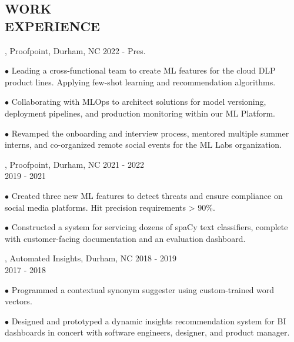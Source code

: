 \documentclass[resmargin, 11pt]{resume_style_class} %
\newenvironment{outline}
  {\begin{list}{}{\setlength{\leftmargin}{30pt}\setlength\itemsep{-2pt}}}
  {\end{list}}
\begin{document}
\begin{resume}

 
\section{WORK \\ EXPERIENCE}
, Proofpoint, Durham, NC \hfill 2022 - Pres.
\begin{outline}
	\item[$\bullet$\hspace{0.1cm}] Leading a cross-functional team to create ML features for the cloud DLP product lines. Applying few-shot learning and recommendation algorithms.
	\item[$\bullet$\hspace{0.1cm}] Collaborating with MLOps to architect solutions for model versioning, deployment pipelines, and production monitoring within our ML Platform.
	\item[$\bullet$\hspace{0.1cm}] Revamped the onboarding and interview process, mentored multiple summer interns, and co-organized remote social events for the ML Labs organization.
\end{outline} 
, Proofpoint, Durham, NC \hfill 2021 - 2022 \\
 \hfill 2019 - 2021
\begin{outline}
	\item[$\bullet$\hspace{0.1cm}] Created three new ML features to detect threats and ensure compliance on social media platforms. Hit precision requirements > 90\%.
	\item[$\bullet$\hspace{0.1cm}] Constructed a system for servicing dozens of spaCy text classifiers, complete with customer-facing documentation and an evaluation dashboard.
\end{outline} 

, Automated Insights, Durham, NC \hfill 2018 - 2019 \\
 \hfill 2017 - 2018
\begin{outline}
	\item[$\bullet$\hspace{0.1cm}] Programmed a contextual synonym suggester using custom-trained word vectors.
	\item[$\bullet$\hspace{0.1cm}] Designed and prototyped a dynamic insights recommendation system for BI dashboards in concert with software engineers, designer, and product manager.
\end{outline} 


\end{resume}
\end{document}
